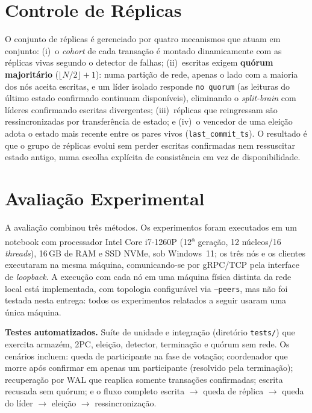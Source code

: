 \documentclass[10pt,twocolumn]{article}
\begin{document}
\section{Controle de Réplicas}
\label{sec:replicas}

O conjunto de réplicas é gerenciado por quatro mecanismos que atuam em
conjunto: (i)~o \emph{cohort} de cada transação é montado dinamicamente com
as réplicas vivas segundo o detector de falhas; (ii)~escritas exigem
\textbf{quórum majoritário} ($\lfloor N/2\rfloor+1$): numa partição de
rede, apenas o lado com a maioria dos nós aceita escritas, e um líder
isolado responde \texttt{no quorum} (as leituras do último estado
confirmado continuam disponíveis), eliminando o \emph{split-brain} com
líderes confirmando escritas divergentes; (iii)~réplicas que reingressam
são ressincronizadas por transferência de estado; e (iv)~o vencedor de uma
eleição adota o estado mais recente entre os pares vivos
(\texttt{last\_commit\_ts}). O resultado é que o grupo de réplicas evolui
sem perder escritas confirmadas nem ressuscitar estado antigo, numa
escolha explícita de consistência em vez de disponibilidade.

\section{Avaliação Experimental}
\label{sec:aval}

A avaliação combinou três métodos. Os experimentos foram executados em um
notebook com processador Intel Core i7-1260P (12\textsuperscript{a} geração,
12 núcleos/16 \emph{threads}), 16\,GB de RAM e SSD NVMe, sob Windows~11; os
três nós e os clientes executaram na mesma máquina, comunicando-se por
gRPC/TCP pela interface de \emph{loopback}. A execução com cada nó em uma
máquina física distinta da rede local está implementada, com topologia
configurável via \texttt{--peers}, mas não foi testada nesta entrega: todos
os experimentos relatados a seguir usaram uma única máquina.

\textbf{Testes automatizados.} Suíte de unidade e integração (diretório
\texttt{tests/}) que exercita armazém, 2PC, eleição, detector, terminação e
quórum sem rede. Os cenários incluem: queda de participante na fase de
votação; coordenador que morre após confirmar em apenas um participante
(resolvido pela terminação); recuperação por WAL que reaplica somente
transações confirmadas; escrita recusada sem quórum; e o fluxo completo
escrita $\rightarrow$ queda de réplica $\rightarrow$ queda do líder
$\rightarrow$ eleição $\rightarrow$ ressincronização.
\end{document}
